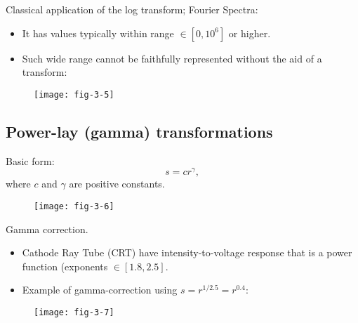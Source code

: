 
\begin{frame}
Classical application of the log transform; Fourier Spectra:
\begin{itemize}
\item It has values typically within range $\in[0,10^{6}]$ or higher.
\item Such wide range cannot be faithfully represented without the aid of a transform:
\end{itemize} 
\begin{figure}
\centering
\texttt{[image: fig-3-5]}
\end{figure}\end{frame}


\subsection{Power-lay (gamma) transformations}


\begin{frame}
Basic form:
\begin{equation}
s = cr^{\gamma},
\end{equation}
where $c$ and $\gamma$ are positive constants.
\begin{figure}
\centering
\texttt{[image: fig-3-6]}
\end{figure}
\end{frame}


\begin{frame}
Gamma correction.
\begin{itemize}
\item Cathode Ray Tube (CRT) have intensity-to-voltage response that is a power function (exponents $\in[1.8,2.5]$.
\item Example of gamma-correction using $s=r^{1/2.5}=r^{0.4}$:
\end{itemize}
\begin{figure}
\centering
\texttt{[image: fig-3-7]}
\end{figure}
\end{frame}

